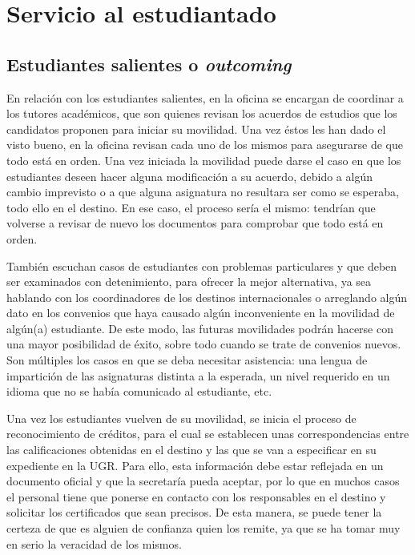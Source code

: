 \section{Servicio al estudiantado}
\subsection{Estudiantes salientes o \textit{outcoming}}

En relación con los estudiantes salientes, en la oficina se encargan de coordinar a los tutores académicos, que son quienes revisan los acuerdos de estudios que los candidatos proponen para iniciar su movilidad. Una vez éstos les han dado el visto bueno, en la oficina revisan cada uno de los mismos para asegurarse de que todo está en orden. Una vez iniciada la movilidad puede darse el caso en que los estudiantes deseen hacer alguna modificación a su acuerdo, debido a algún cambio imprevisto o a que alguna asignatura no resultara ser como se esperaba, todo ello en el destino. En ese caso, el proceso sería el mismo: tendrían que volverse a revisar de nuevo los documentos para comprobar que todo está en orden.

También escuchan casos de estudiantes con problemas particulares y que deben ser examinados con detenimiento, para ofrecer la mejor alternativa, ya sea hablando con los coordinadores de los destinos internacionales o arreglando algún dato en los convenios que haya causado algún inconveniente en la movilidad de algún(a) estudiante. De este modo, las futuras movilidades podrán hacerse con una mayor posibilidad de éxito, sobre todo cuando se trate de convenios nuevos. Son múltiples los casos en que se deba necesitar asistencia: una lengua de impartición de las asignaturas distinta a la esperada, un nivel requerido en un idioma que no se había comunicado al estudiante, etc.

Una vez los estudiantes vuelven de su movilidad, se inicia el proceso de reconocimiento de créditos, para el cual se establecen unas correspondencias entre las calificaciones obtenidas en el destino y las que se van a especificar en su expediente en la UGR. Para ello, esta información debe estar reflejada en un documento oficial y que la secretaría pueda aceptar, por lo que en muchos casos el personal tiene que ponerse en contacto con los responsables en el destino y solicitar los certificados que sean precisos. De esta manera, se puede tener la certeza de que es alguien de confianza quien los remite, ya que se ha tomar muy en serio la veracidad de los mismos.

